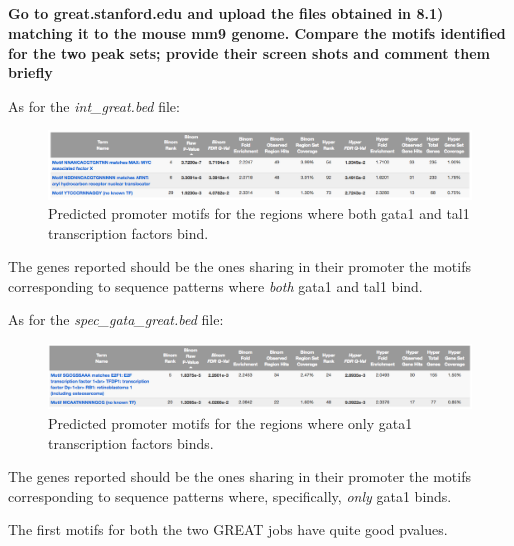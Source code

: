 \documentclass[12pt, a4paper]{article}
\begin{document}
\subsection{}
\textbf{Go to great.stanford.edu and upload the files obtained in 8.1) matching it to the mouse mm9 genome. Compare the motifs identified for the two peak sets; provide their screen shots and comment them briefly}

As for the \textit{int\_great.bed} file:

\begin{figure}[h]
	\centering
	\includegraphics[width = .99\textwidth]{int_great}
	\caption{Predicted promoter motifs for the regions where both gata1 and tal1 transcription factors bind.}
	\label{fig:int_great}
\end{figure}

The genes reported should be the ones sharing in their promoter the motifs corresponding to sequence patterns where \textit{both} gata1 and tal1 bind.

As for the \textit{spec\_gata\_great.bed} file:

\begin{figure}[h]
	\centering
	\includegraphics[width = .99\textwidth]{spec_gata_great}
	\caption{Predicted promoter motifs for the regions where only gata1 transcription factors binds.}
	\label{fig:spec_gata_great}
\end{figure}

The genes reported should be the ones sharing in their promoter the motifs corresponding to sequence patterns where, specifically, \textit{only} gata1 binds.

The first motifs for both the two GREAT jobs have quite good pvalues.
\end{document}
